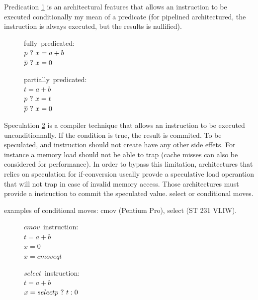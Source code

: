 Predication \ref{fig:pred} is an architectural features that allows an instruction to be executed conditionally my mean of a predicate (for pipelined architectured, the instruction is always executed, but the results is nullified). 

\begin{figure}
\begin{minipage}[t]{4cm}
\mbox{fully predicated:} \\
$ p ~?~ x = a + b $ \\
$ \overline{p} ~?~ x = 0 $ \\
\end{minipage}
\begin{minipage}[t]{4cm}
\mbox{partially predicated:} \\
$t = a + b $ \\
$p ~?~ x = t $ \\
$\overline{p} ~?~ x = 0 $ \\
\end{minipage}
\label{fig:pred}
\end{figure}

Speculation \ref{fig:spec} is a compiler technique that allows an instruction to be executed unconditionnally. If the condition is true, the result is commited. To be speculated, and instruction should not create have any other side effets. For instance a memory load should not be able to trap (cache misses can also be considered for performance). In order to bypass this limitation, architectures that relies on speculation for if-conversion useally provde a speculative load operantion that will not trap in case of invalid memory access. Those architectures must provide a instruction to commit the speculated value. select or conditional moves.

examples of conditional moves: cmov (Pentium Pro), select (ST 231 VLIW).

\begin{figure}
\begin{minipage}[t]{4cm}
\mbox{$cmov$ instruction:} \\
$t = a + b $ \\
$x = 0 $ \\
$x = cmoveq t $ \\
\end{minipage}
\begin{minipage}[t]{4cm}
\mbox{$select$ instruction:} \\
$t = a + b $ \\
$x = select p ~?~ t : 0 $ \\
\end{minipage}
\label{fig:spec}
\end{figure}

